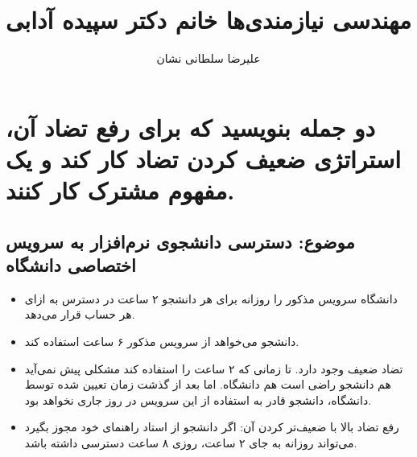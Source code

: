 \documentclass[a4paper]{article}
\title{مهندسی نیازمندی‌ها خانم دکتر سپیده آدابی}
\author{علیرضا سلطانی نشان}
\begin{document}
\maketitle

\section*{دو جمله بنویسید که برای رفع تضاد آن، استراتژی ضعیف کردن تضاد کار کند و
یک مفهوم مشترک کار کنند.}

\subsection*{موضوع: دسترسی دانشجوی نرم‌افزار به سرویس  اختصاصی دانشگاه}

\begin{itemize}
    \item دانشگاه سرویس مذکور را روزانه برای هر دانشجو ۲ ساعت در دسترس به ازای
    هر حساب قرار می‌دهد.
    \item دانشجو می‌خواهد از سرویس مذکور ۶ ساعت استفاده کند.
    \item تضاد ضعیف وجود دارد. تا زمانی که ۲ ساعت را استفاده کند مشکلی پیش
    نمی‌آید هم دانشجو راضی است هم دانشگاه. اما بعد از گذشت زمان تعیین شده توسط
    دانشگاه، دانشجو قادر به استفاده از این سرویس در روز جاری نخواهد بود. 
    \item رفع تضاد بالا با ضعیف‌تر کردن آن: اگر دانشجو از استاد راهنمای خود مجوز
    بگیرد می‌تواند روزانه به جای ۲ ساعت، روزی ۸ ساعت دسترسی داشته باشد.
\end{itemize}
\end{document}
